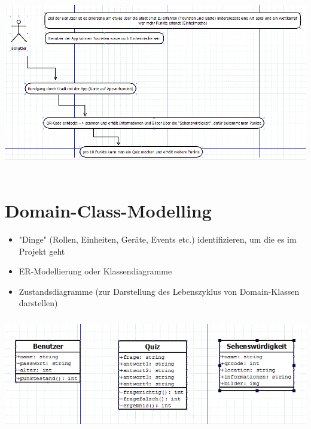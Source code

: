 \includegraphics[height=8cm]{usecase}

\section{Domain-Class-Modelling}
\begin{itemize}
	\item "Dinge" (Rollen, Einheiten, Geräte, Events etc.) identifizieren, um die es im Projekt geht
	\item ER-Modellierung oder Klassendiagramme
	\item Zustandsdiagramme (zur Darstellung des Lebenszyklus von Domain-Klassen darstellen)
\end{itemize}

\includegraphics[height=5cm]{domainclass}

